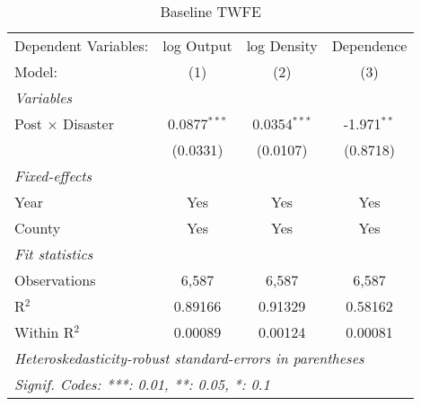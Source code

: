 
\begin{table}[htbp]
   \caption{Baseline TWFE}
   \centering
   \begin{adjustbox}{max width = \textwidth, center}
      \begin{tabular}{lccc}
         \tabularnewline \midrule \midrule
         Dependent Variables:    & log Output     & log Density    & Dependence\\  
         Model:                  & (1)            & (2)            & (3)\\  
         \midrule
         \emph{Variables}\\
         Post $\times$ Disaster  & 0.0877$^{***}$ & 0.0354$^{***}$ & -1.971$^{**}$\\   
                                 & (0.0331)       & (0.0107)       & (0.8718)\\   
         \midrule
         \emph{Fixed-effects}\\
         Year                    & Yes            & Yes            & Yes\\  
         County                  & Yes            & Yes            & Yes\\  
         \midrule
         \emph{Fit statistics}\\
         Observations            & 6,587          & 6,587          & 6,587\\  
         R$^2$                   & 0.89166        & 0.91329        & 0.58162\\  
         Within R$^2$            & 0.00089        & 0.00124        & 0.00081\\  
         \midrule \midrule
         \multicolumn{4}{l}{\emph{Heteroskedasticity-robust standard-errors in parentheses}}\\
         \multicolumn{4}{l}{\emph{Signif. Codes: ***: 0.01, **: 0.05, *: 0.1}}\\
      \end{tabular}
   \end{adjustbox}
\end{table}


